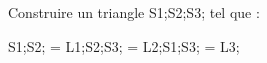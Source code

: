 \documentclass[exercice]{thedocument}%
\begin{document}
%
\smallskip\par\noindent
Construire un triangle \<S1;\<S2;\<S3; tel que :\medskip\par
\<S1;\<S2; = \<L1;\quad\<S2;\<S3; = \<L2;\quad\<S1;\<S3; = \<L3;
\end{document}
